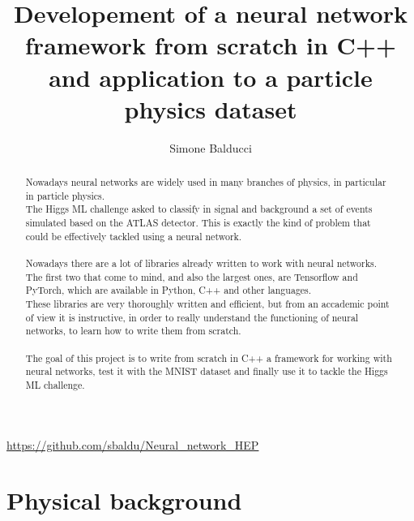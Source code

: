 \documentclass[12pt]{article}
\title{Developement of a neural network framework from scratch in C++ and application to a particle 
physics dataset}
\author{Simone Balducci}
\date{}
\begin{document}
\maketitle
\begin{center}
	\url{https://github.com/sbaldu/Neural_network_HEP}
\end{center}

\begin{abstract}
  \noindent Nowadays neural networks are widely used in many branches of physics, in par\-ti\-cu\-lar 
  in particle physics. \\
  The Higgs ML challenge asked to classify in signal and background a set of events simulated based on the 
  ATLAS detector. This is exactly the kind of problem that could be effectively tackled using a neural 
  network. \\ \\
  Nowadays there are a lot of libraries already written to work with neural networks. The first two that
  come to mind, and also the largest ones, are Tensorflow and PyTorch, which are available in Python, C++ 
  and other languages. \\
  These libraries are very thoroughly written and efficient, but from an accademic point of view it is
  instructive, in order to really understand the functioning of neural networks, to learn how to write 
  them from scratch. \\ \\
  The goal of this project is to write from scratch in C++ a framework for wor\-king with neu\-ral networks, 
  test it with the MNIST dataset and finally use it to tackle the Higgs ML challenge.
\end{abstract}
\pagebreak

\tableofcontents
\pagebreak

\section{Physical background}
\end{document}
